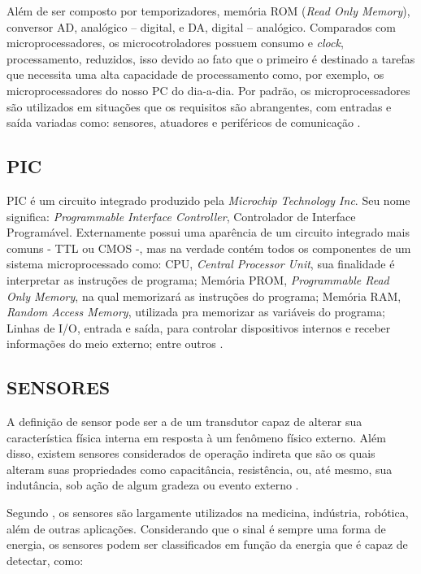 Além de ser composto por temporizadores, memória ROM (\emph{Read Only Memory}), conversor AD, analógico – digital, e DA, digital – analógico.
Comparados com microprocessadores, os microcotroladores possuem consumo e \emph{clock}, processamento, reduzidos, isso devido ao fato que o primeiro é destinado a tarefas que necessita uma alta capacidade de processamento como, por exemplo, os microprocessadores do nosso PC do dia-a-dia. Por padrão, os microprocessadores são utilizados em situações que os requisitos são abrangentes, com entradas e saída variadas como: sensores, atuadores e periféricos de comunicação \cite{lee2011introduction}.

\subsection{PIC}
PIC é um circuito integrado produzido pela \emph{Microchip Technology Inc}. Seu nome significa: \emph{Programmable Interface Controller}, Controlador de Interface Programável. Externamente possui uma aparência de um circuito integrado mais comuns - TTL ou CMOS -, mas na verdade contém todos os componentes de um sistema microprocessado como: CPU, \emph{Central Processor Unit}, sua finalidade é interpretar as instruções de programa; Memória PROM, \emph{Programmable Read Only Memory}, na qual memorizará as instruções do programa; Memória RAM, \emph{Random Access Memory}, utilizada pra memorizar as variáveis do programa; Linhas de I/O, entrada e saída, para controlar dispositivos internos e receber informações do meio externo; entre outros \cite{radio2012amadores,wikipedia2012pic}.

\subsection{SENSORES}
A definição de sensor pode ser a de um transdutor capaz de alterar sua característica física interna em resposta à um fenômeno físico externo. Além disso, existem sensores considerados de operação indireta que são os quais alteram suas propriedades como capacitância, resistência, ou, até mesmo, sua indutância, sob ação de algum gradeza ou evento externo \cite{rosario2006principios}. 

Segundo \cite{nomadusp2014}, os sensores são largamente utilizados na medicina, indústria, robótica, além de outras aplicações. Considerando que o sinal é sempre uma forma de energia, os sensores podem ser classificados em função da energia que é capaz de detectar, como:

